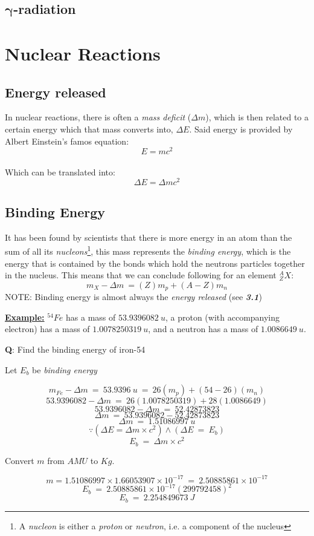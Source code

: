 \documentclass[12pt]{article}
\begin{document}
\subsection{$\bm{\gamma}$-radiation}

\newpage

\section{Nuclear Reactions}

\subsection{Energy released}

In nuclear reactions, there is often a \emph{mass deficit} ($\Delta m$), which is then related to a certain energy which that mass converts into, $\Delta E$. Said energy is provided by Albert Einstein's famos equation: $$E = mc^2$$ \\
Which can be translated into: $$\Delta E = \Delta mc^2$$

\subsection{Binding Energy}
It has been found by scientists that there is more energy in an atom than the sum of all its \emph{nucleons}\footnote{A \emph{nucleon} is either a \emph{proton} or \emph{neutron}, i.e. a component of the nucleus}, this mass represents the \emph{binding energy}, which is the energy that is contained by the bonds which hold the neutrons particles together in the nucleus. This means that we can conclude following for an element $^{A}_{Z}X$: $$m_X - \Delta m \ = (Z)m_p + (A-Z)m_n$$
\bigbreak
NOTE: Binding energy is almost always the \emph{energy released} (see \textbf{\emph{3.1}})

\newpage

\begin{boxA}
	\textbf{\underline{Example:}}\bigbreak
	$^{54}Fe$ has a mass of $53.9396082 \ u$, a proton (with accompanying electron)
 has a mass of $1.0078250319 \ u$, and a neutron has a mass of $1.0086649 \ u$. \bigbreak

 \textbf{Q}: Find the binding energy of iron-54 \bigbreak

 Let $E_b$ be \emph{binding energy}

$$m_{Fe} - \Delta m \ = \ 53.9396 \ u \ = \ 26(m_p) + (54-26)(m_n)$$
$$53.9396082 - \Delta m \ = \ 26(1.0078250319) + 28(1.0086649)$$
$$53.9396082 - \Delta m \ = \ 52.42873823$$
$$\Delta m \ = \ 53.9396082 - 52.42873823$$
$$\Delta m \ = \ 1.51086997 \ u$$ \bigbreak
$$\because \left(\Delta E = \Delta m \times c^2 \right) \land \left(\Delta E \ = \ E_b \right)$$
$$E_b \ = \ \Delta m \times c^2$$
\begin{center}
Convert $m$ from $AMU$ to $Kg$. 
\end{center}
$$m = 1.51086997 \times 1.66053907 \times 10^{-17} \ = \ 2.50885861 \times 10^{-17}$$
$$E_b \ = \ 2.50885861 \times 10^{-17}(299 792 458)^2$$
$$E_b \ = \ 2.254849673 \ J$$
\end{boxA}
\end{document}
